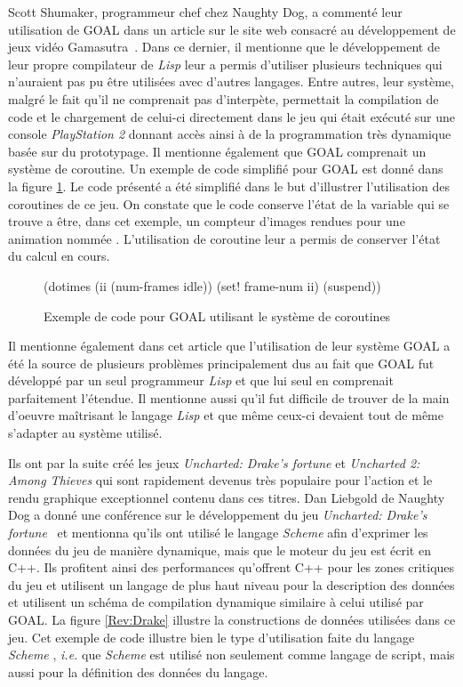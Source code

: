 \documentclass[12pt,twoside,letterpaper,francais]{book}
\newcommand{\ie}{{\textit{i.e. }}}
\newcommand{\lisp}{{\textit{Lisp }}}
\newcommand{\Schemelang}{{\textit{Scheme }}}
\newcommand{\scheme}[1]{\selectlanguage{english}{\tt #1}\selectlanguage{french}}
\begin{document}
Scott Shumaker, programmeur chef chez Naughty Dog, a commenté leur
utilisation de GOAL dans un article sur le site web consacré au
développement de jeux vidéo Gamasutra~\cite{ND_GOAL}. Dans ce dernier,
il mentionne que le développement de leur propre compilateur de \lisp
leur a permis d'utiliser plusieurs techniques qui n'auraient pas pu
être utilisées avec d'autres langages. Entre autres, leur système,
malgré le fait qu'il ne comprenait pas d'interpète, permettait la
compilation de code et le chargement de celui-ci directement dans le
jeu qui était exécuté sur une console \textit{PlayStation 2} donnant
accès ainsi à de la programmation très dynamique basée sur du
prototypage. Il mentionne également que GOAL comprenait un système de
coroutine. Un exemple de code simplifié pour GOAL est donné dans la
figure \ref{Rev:goal}. Le code présenté a été simplifié dans le but
d'illustrer l'utilisation des coroutines de ce jeu. On constate que le
code conserve l'état de la variable \scheme{ii} qui se trouve a être,
dans cet exemple, un compteur d'images rendues pour une animation
nommée \scheme{idle}. L'utilisation de coroutine leur a permis de
conserver l'état du calcul en cours.\\

\begin{figure}[htb!]
  \begin{schemecode}
(dotimes (ii (num-frames idle))
  (set! frame-num ii)
  (suspend))
  \end{schemecode}
  \caption{Exemple de code pour GOAL utilisant le système de coroutines}
  \label{Rev:goal}
\end{figure}

Il mentionne également dans cet article que l'utilisation de leur
système GOAL a été la source de plusieurs problèmes principalement dus
au fait que GOAL fut développé par un seul programmeur \lisp et que lui
seul en comprenait parfaitement l'étendue. Il mentionne aussi qu'il
fut difficile de trouver de la main d'oeuvre maîtrisant le langage
\lisp et que même ceux-ci devaient tout de même s'adapter au système
utilisé.

Ils ont par la suite créé les jeux \textit{Uncharted: Drake's fortune}
et \textit{Uncharted 2: Among Thieves} qui sont rapidement devenus
très populaire pour l'action et le rendu graphique exceptionnel
contenu dans ces titres. Dan Liebgold de Naughty Dog a donné une
conférence sur le développement du jeu \textit{Uncharted: Drake's
  fortune}~\cite{ND_DRAKE} et mentionna qu'ils ont utilisé le langage
\Schemelang afin d'exprimer les données du jeu de manière dynamique,
mais que le moteur du jeu est écrit en C++. Ils profitent ainsi des
performances qu'offrent C++ pour les zones critiques du jeu et
utilisent un langage de plus haut niveau pour la description des
données et utilisent un schéma de compilation dynamique similaire à
celui utilisé par GOAL. La figure \ref{Rev:Drake} illustre la
constructions de données utilisées dans ce jeu. Cet exemple de code
illustre bien le type d'utilisation faite du langage \Schemelang, \ie
que \Schemelang est utilisé non seulement comme langage de script,
mais aussi pour la définition des données du langage.\\
\end{document}
